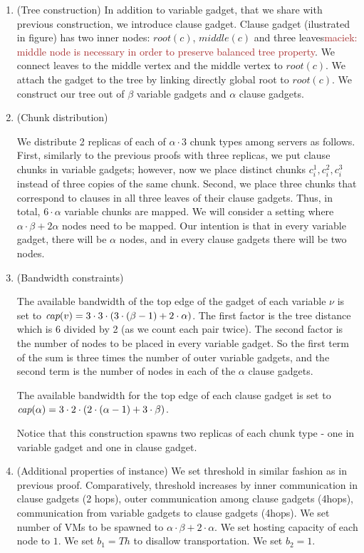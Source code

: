 \documentclass[9pt]{sigcomm-alternate}
\newcommand{\maciek}[1]{\textcolor{brown}{maciek: #1}}
\newcommand{\variab}{\nu}
\newcommand{\clauses}{\alpha}
\newcommand{\vars}{\beta}
\newcommand{\capa}{\emph{cap}}
\newcommand{\CostTrans}{\ensuremath{b_1}}
\newcommand{\CostCom}{\ensuremath{b_2}}
\newcommand{\Thr}{\ensuremath{Th}}
\begin{document}
\begin{appendix}
\begin{enumerate}
  \item (Tree construction) In addition to variable gadget, that we
    share with previous construction, we introduce clause
    gadget. Clause gadget (ilustrated in figure) has two inner nodes:
    $root(c)$, $middle(c)$ and three leaves\maciek{middle node is
      necessary in order to preserve balanced tree property}. We connect leaves to the
    middle vertex and the middle vertex to $root(c)$. We attach the
    gadget to the tree by linking directly global root to
    $root(c)$. We construct our tree out of $\vars$ variable gadgets
    and $\clauses$ clause gadgets.
  \item (Chunk distribution)

    We distribute 2 replicas of  each of $\clauses \cdot 3$ chunk types among servers as follows. First, similarly to the
previous proofs with three replicas, we put clause chunks in variable
gadgets; however, now we place distinct chunks $c^1_i, c^2_i, c^3_i$
instead of three copies of the same chunk. Second, we place three
chunks that correspond to clauses in all three leaves of their clause
gadgets.  Thus, in total, $6 \cdot \clauses$ variable chunks are
mapped.  We will consider a setting where $\clauses \cdot \vars +
2\clauses$ nodes need to be mapped. Our intention is that in every
variable gadget, there will be $\clauses$ nodes, and in every clause
gadgets there will be two nodes.

  \item (Bandwidth constraints)

    The available bandwidth of the top edge of the gadget of each variable $\variab$ is set to
$\capa(v) = 3  \cdot  3  \cdot  (3  \cdot  (\vars - 1) + 2  \cdot  \clauses) $.
The first factor is the tree distance which is 6 divided by 2 (as
we count each pair twice). The second factor is
the number of nodes to be placed in every variable gadget.
So the first term of the
sum is three times the number of outer variable gadgets,
and the second term is the
number of nodes in each of the $\clauses$ clause gadgets.

The available bandwidth for the top edge of each clause gadget is set to
$\capa(\clauses) = 3  \cdot  2  \cdot  (2  \cdot  (\clauses - 1) + 3  \cdot  \vars) $.

Notice that this construction spawns two replicas of each chunk type -
one in variable gadget and one in clause gadget.

  \item (Additional properties of instance) We set threshold in
    similar fashion as in previous proof. Comparatively,
threshold increases by inner communication in clause
  gadgets (2 hops), outer communication among clause gadgets (4hops),
  communication from variable gadgets to clause gadgets (4hops). We
  set number of VMs to be spawned to $\clauses \cdot \vars + 2 \cdot
  \clauses$. We set hosting capacity of each node to $1$. We set
  $\CostTrans = \Thr$ to disallow transportation. We set $\CostCom = 1$.



\end{enumerate}
\end{appendix}
\end{document}
